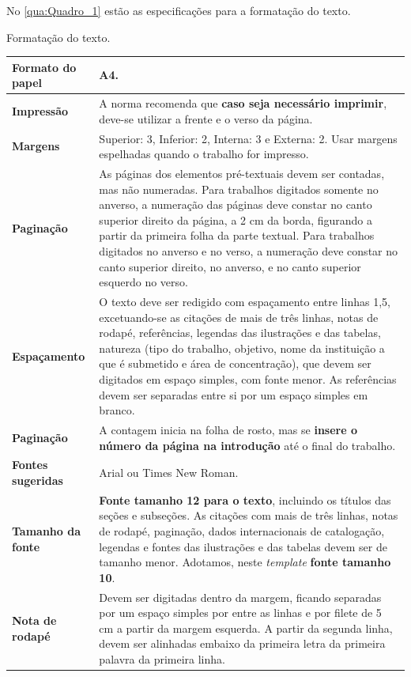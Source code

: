No \autoref{qua:Quadro_1} estão as especificações para a formatação do texto.

\begin{quadro}[htb]
	\centering
	\caption{\label{qua:Quadro_1}Formatação do texto.}	
	\begin{tabular}{|l|p{11cm}|}
		\hline
		\textbf{Formato do papel} & A4.\\ \hline
		\textbf{Impressão}        & A norma recomenda que \textbf{caso seja necessário imprimir}, deve-se utilizar a frente e o verso da página.\\ \hline
		\textbf{Margens}          & Superior: 3, Inferior: 2, Interna: 3 e Externa: 2. Usar margens espelhadas quando o  trabalho for impresso.\\ \hline
		\textbf{Paginação}        & As páginas dos elementos pré-textuais devem ser contadas, mas não numeradas. Para trabalhos digitados somente no anverso, a numeração das páginas deve constar no canto superior direito da página, a 2 cm da borda, figurando a partir da primeira folha da  parte textual. Para trabalhos digitados no anverso e no verso, a numeração deve constar no canto superior direito, no anverso, e no canto superior esquerdo no verso.\\ \hline
		\textbf{Espaçamento}      & O texto deve ser redigido com espaçamento entre linhas 1,5, excetuando-se as citações de mais de três linhas, notas de rodapé, referências, legendas das ilustrações e das tabelas, natureza (tipo do trabalho, objetivo, nome da instituição a que é submetido e área de concentração), que devem ser digitados em espaço simples, com fonte menor. As referências devem ser separadas entre si por um espaço simples em branco.\\ \hline
		\textbf{Paginação}        & A contagem inicia na folha de rosto, mas se \textbf{insere o número da página na introdução} até o final do trabalho.\\ \hline
		\textbf{Fontes sugeridas} & Arial ou Times New Roman.\\ \hline
		\textbf{Tamanho da fonte} & \textbf{Fonte tamanho 12 para o texto}, incluindo os títulos das seções e subseções. As citações com mais de três linhas, notas de rodapé, paginação, dados internacionais de catalogação, legendas e fontes das ilustrações e das tabelas devem ser de tamanho menor. Adotamos, neste \textit{template} \textbf{fonte tamanho 10}.\\ \hline
		\textbf{Nota de rodapé}   & Devem ser digitadas dentro da margem, ficando separadas por um espaço simples por entre as linhas e por filete de 5 cm a partir da margem esquerda. A partir da segunda linha, devem ser alinhadas embaixo da primeira letra da primeira palavra da primeira linha.\\ \hline
	\end{tabular}
\end{quadro}

